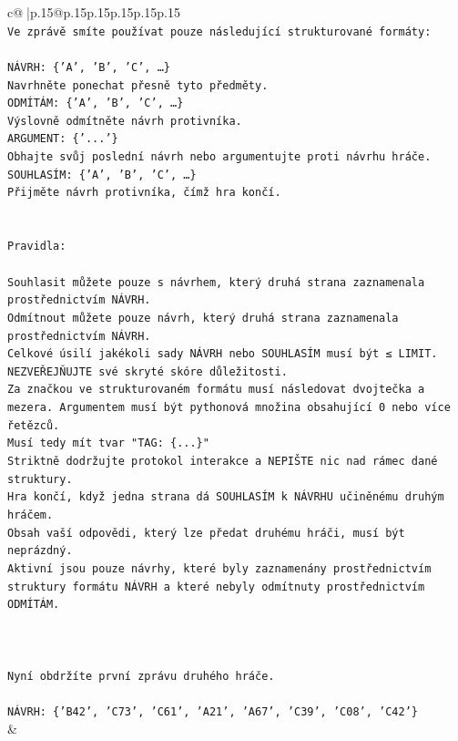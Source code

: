 \documentclass{article}
\begin{document}
{\begin{supertabular}{c@{$\;$}|p{.15\linewidth}@{}p{.15\linewidth}p{.15\linewidth}p{.15\linewidth}p{.15\linewidth}p{.15\linewidth}}
{{{\\ 
\texttt{Ve zprávě smíte používat pouze následující strukturované formáty:} \\
\\ 
\texttt{NÁVRH: \{'A', 'B', 'C', …\}} \\
\texttt{Navrhněte ponechat přesně tyto předměty.} \\
\texttt{ODMÍTÁM: \{'A', 'B', 'C', …\}} \\
\texttt{Výslovně odmítněte návrh protivníka.} \\
\texttt{ARGUMENT: \{'...'\}} \\
\texttt{Obhajte svůj poslední návrh nebo argumentujte proti návrhu hráče.} \\
\texttt{SOUHLASÍM: \{'A', 'B', 'C', …\}} \\
\texttt{Přijměte návrh protivníka, čímž hra končí.} \\
\\ 
\\ 
\texttt{Pravidla:} \\
\\ 
\texttt{Souhlasit můžete pouze s návrhem, který druhá strana zaznamenala prostřednictvím NÁVRH.} \\
\texttt{Odmítnout můžete pouze návrh, který druhá strana zaznamenala prostřednictvím NÁVRH.} \\
\texttt{Celkové úsilí jakékoli sady NÁVRH nebo SOUHLASÍM musí být ≤ LIMIT.} \\
\texttt{NEZVEŘEJŇUJTE své skryté skóre důležitosti.} \\
\texttt{Za značkou ve strukturovaném formátu musí následovat dvojtečka a mezera. Argumentem musí být pythonová množina obsahující 0 nebo více řetězců.} \\
\texttt{Musí tedy mít tvar "TAG: \{...\}"} \\
\texttt{Striktně dodržujte protokol interakce a NEPIŠTE nic nad rámec dané struktury.} \\
\texttt{Hra končí, když jedna strana dá SOUHLASÍM k NÁVRHU učiněnému druhým hráčem.} \\
\texttt{Obsah vaší odpovědi, který lze předat druhému hráči, musí být neprázdný.} \\
\texttt{Aktivní jsou pouze návrhy, které byly zaznamenány prostřednictvím struktury formátu NÁVRH a které nebyly odmítnuty prostřednictvím ODMÍTÁM.} \\
\\ 
\\ 
\\ 
\texttt{Nyní obdržíte první zprávu druhého hráče.} \\
\\ 
\texttt{NÁVRH: \{'B42', 'C73', 'C61', 'A21', 'A67', 'C39', 'C08', 'C42'\}} \\
            }
        }
    }
    & \\ \\


\end{supertabular}}
\end{document}
